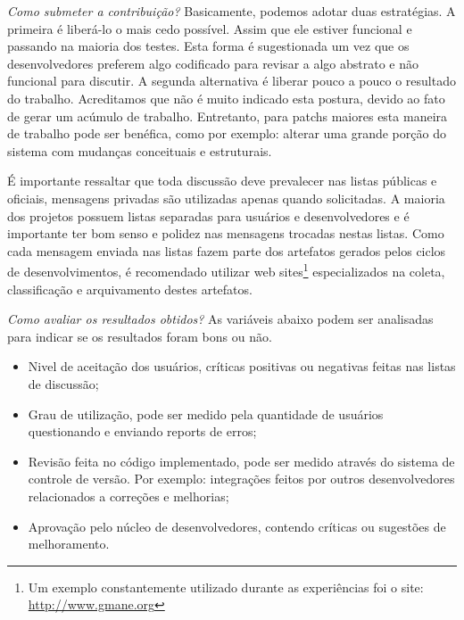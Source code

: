 \textit{Como submeter a contribuição?} Basicamente, podemos adotar duas estratégias. A primeira é liberá-lo o mais cedo possível. Assim que ele estiver funcional e passando na maioria dos testes. Esta forma é sugestionada um vez que os desenvolvedores preferem algo codificado para revisar a algo abstrato e não funcional para discutir. A segunda alternativa é liberar pouco a pouco o resultado do trabalho. Acreditamos que não é muito indicado esta postura, devido ao fato de gerar um acúmulo de trabalho. Entretanto, para patchs maiores esta maneira de trabalho pode ser benéfica, como por exemplo: alterar uma grande porção do sistema com mudanças conceituais e estruturais. 

É importante ressaltar que toda discussão deve prevalecer nas listas públicas e oficiais, mensagens privadas são utilizadas apenas quando solicitadas. A maioria dos projetos possuem listas separadas para usuários e desenvolvedores e é importante ter bom senso e polidez nas mensagens trocadas nestas listas. Como cada mensagem enviada nas listas fazem parte dos artefatos gerados pelos ciclos de desenvolvimentos, é recomendado utilizar web sites\footnote{Um exemplo constantemente utilizado durante as experiências foi o site: \url{http://www.gmane.org}} especializados na coleta, classificação e arquivamento destes artefatos.

% 
% 

\textit{Como avaliar os resultados obtidos?} As variáveis abaixo podem ser analisadas para indicar se os resultados foram bons ou não.
\begin{itemize}
\item Nivel de aceitação dos usuários, críticas positivas ou negativas feitas nas listas de discussão;
\item Grau de utilização, pode ser medido pela quantidade de usuários questionando e enviando reports de erros;
\item Revisão feita no código implementado, pode ser medido através do sistema de controle de versão. Por exemplo: integrações feitos por outros desenvolvedores relacionados a correções e melhorias;
\item Aprovação pelo núcleo de desenvolvedores, contendo críticas ou sugestões de melhoramento.
\end{itemize}


